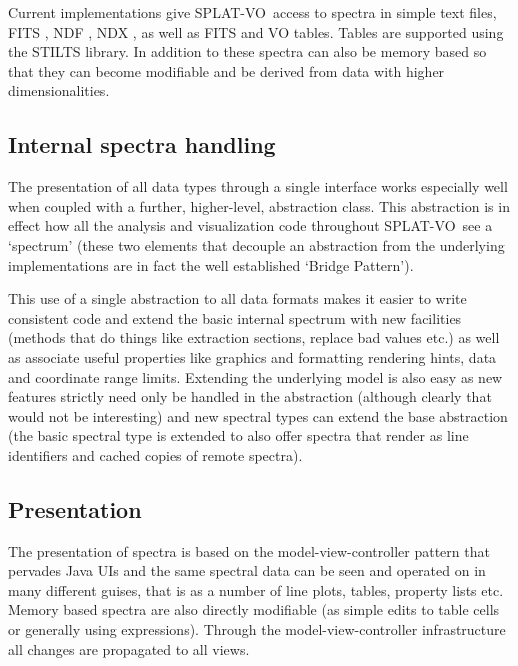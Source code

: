 \documentclass[final,authoryear,5p,times,twocolumn]{elsarticle}
\newcommand{\splatvo}{{\textsf{\small{SPLAT-VO}}}}
\newcommand{\ascl}[1]{\href{http://www.ascl.net/#1}{ascl:#1}}
\begin{document}
Current implementations give \splatvo\ access to spectra in simple text files,
FITS \citep{2010A&A...524A..42P}, NDF \citep{ndfjenness}, NDX
\citep{2003ASPC..295..221G}, as well as FITS and VO tables. Tables are
supported using the STILTS \citep[][\ascl{1105.001}]{2006ASPC..351..666T}
library. In addition to these spectra can also be memory based so that they can
become modifiable and be derived from data with higher dimensionalities.

\subsection{Internal spectra handling}

The presentation of all data types through a single interface works especially
well when coupled with a further, higher-level, abstraction class. This
abstraction is in effect how all the analysis and visualization code throughout
\splatvo\ see a `spectrum' (these two elements that decouple an abstraction
from the underlying implementations are in fact the well established `Bridge
Pattern').

This use of a single abstraction to all data formats makes it easier to write
consistent code and extend the basic internal spectrum with new facilities
(methods that do things like extraction sections, replace bad values etc.) as
well as associate useful properties like graphics and formatting rendering
hints, data and coordinate range limits. Extending the underlying model is also
easy as new features strictly need only be handled in the abstraction (although
clearly that would not be interesting) and new spectral types can extend the
base abstraction (the basic spectral type is extended to also offer spectra
that render as line identifiers and cached copies of remote spectra).


\subsection{Presentation}

The presentation of spectra is based on the model-view-controller pattern that
pervades Java UIs and the same spectral data can be seen and operated on in
many different guises, that is as a number of line plots, tables, property
lists etc. Memory based spectra are also directly modifiable (as simple edits
to table cells or generally using expressions). Through the
model-view-controller infrastructure all changes are propagated to all views.
\end{document}
